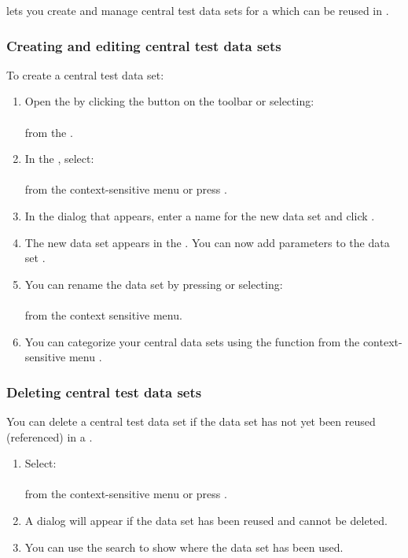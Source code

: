 \app{} lets you create and manage central test data sets for a \gdproject{} which can be reused in \gdcases{}. 

\subsubsection{Creating and editing central test data sets}
\label{TasksCentralDataCreate}

To create a central test data set:
\begin{enumerate}
\item Open the  \gddataeditor{} by clicking the  button on the toolbar or selecting:\\
\\
from the \gdtestsuitebrowser{}.
\item In the \gddataeditor{}, select:\\
\\
from the context-sensitive menu or press .
\item In the dialog that appears, enter a name for the new data set and click .
\item The new data set appears in the \gddataeditor{}. You can now add parameters to the data set .
\item You can rename the data set by pressing or selecting:\\
\\
from the context sensitive menu.
\item You can categorize your central data sets using the  function from the context-sensitive menu .
\end{enumerate}

\subsubsection{Deleting central test data sets}
You can delete a central test data set if the data set has not yet been reused (referenced) in a \gdcase{} . 
\begin{enumerate}
\item Select:\\
\\
from the context-sensitive menu or press .

\item A dialog will appear if the data set has been reused and cannot be deleted.
\item You can use the search  to show where the data set has been used.
\end{enumerate}

